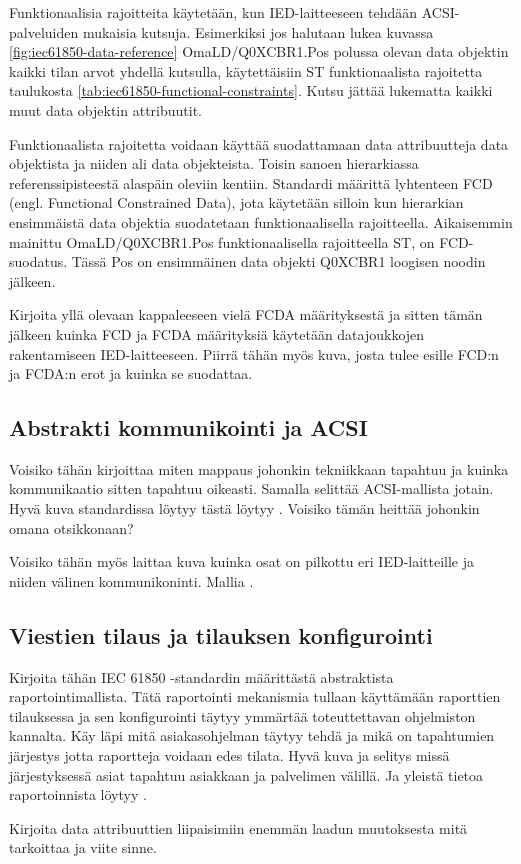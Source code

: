 Funktionaalisia rajoitteita käytetään, kun IED-laitteeseen tehdään ACSI-palveluiden mukaisia kutsuja. Esimerkiksi jos halutaan lukea kuvassa \ref{fig:iec61850-data-reference} OmaLD/Q0XCBR1.Pos polussa olevan data objektin kaikki tilan arvot yhdellä kutsulla, käytettäisiin ST funktionaalista rajoitetta taulukosta \ref{tab:iec61850-functional-constraints}. Kutsu jättää lukematta kaikki muut data objektin attribuutit.

Funktionaalista rajoitetta voidaan käyttää suodattamaan data attribuutteja data objektista ja niiden ali data objekteista. Toisin sanoen hierarkiassa referenssipisteestä alaspäin oleviin kentiin. Standardi määrittä lyhtenteen FCD (engl. Functional Constrained Data), jota käytetään silloin kun hierarkian ensimmäistä data objektia suodatetaan funktionaalisella rajoitteella. Aikaisemmin mainittu OmaLD/Q0XCBR1.Pos funktionaalisella rajoitteella ST, on FCD-suodatus. Tässä Pos on ensimmäinen data objekti Q0XCBR1 loogisen noodin jälkeen.

\begin{it}
	Kirjoita yllä olevaan kappaleeseen vielä FCDA määrityksestä ja sitten tämän jälkeen kuinka FCD ja FCDA määrityksiä käytetään datajoukkojen rakentamiseen IED-laitteeseen. Piirrä tähän myös kuva, josta tulee esille FCD:n ja FCDA:n erot ja kuinka se suodattaa.
\end{it}	

\subsection{Abstrakti kommunikointi ja ACSI}
\begin{it}
	Voisiko tähän kirjoittaa miten mappaus johonkin tekniikkaan tapahtuu ja kuinka kommunikaatio sitten tapahtuu oikeasti. Samalla selittää ACSI-mallista jotain. Hyvä kuva standardissa löytyy tästä löytyy \cite[s.~76]{IEC61850-7-1}. Voisiko tämän heittää johonkin omana otsikkonaan?
	
	Voisiko tähän myös laittaa kuva kuinka osat on pilkottu eri IED-laitteille ja niiden välinen kommunikoninti. Mallia \cite[s.~31]{IEC61850-7-1}.
\end{it}


\subsection{Viestien tilaus ja tilauksen konfigurointi}
\begin{it}
	Kirjoita tähän IEC 61850 -standardin määrittästä abstraktista raportointimallista. Tätä raportointi mekanismia tullaan käyttämään raporttien tilauksessa ja sen konfigurointi täytyy ymmärtää toteuttettavan ohjelmiston kannalta. Käy läpi mitä asiakasohjelman täytyy tehdä ja mikä on tapahtumien järjestys jotta raportteja voidaan edes tilata.
	Hyvä kuva ja selitys missä järjestyksessä asiat tapahtuu asiakkaan ja palvelimen välillä. Ja yleistä tietoa raportoinnista löytyy \cite[s.~40--44]{IEC61850-7-1}.
	
	Kirjoita data attribuuttien liipaisimiin enemmän laadun muutoksesta mitä tarkoittaa ja viite sinne.
\end{it}

